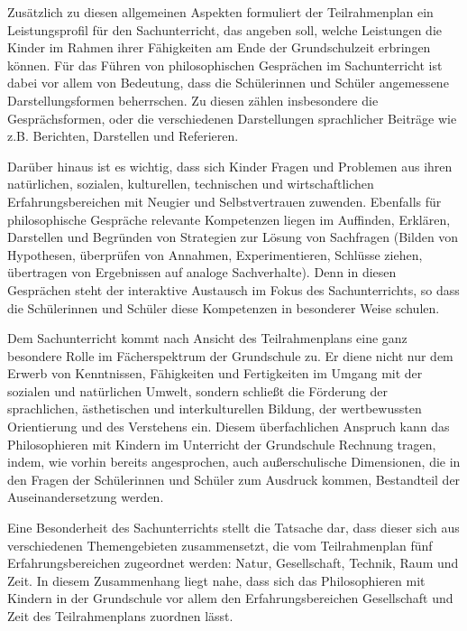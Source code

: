 Zusätzlich zu diesen allgemeinen Aspekten formuliert der Teilrahmenplan ein Leistungsprofil für den Sachunterricht, das angeben soll, welche Leistungen die Kinder im Rahmen ihrer Fähigkeiten am Ende der Grundschulzeit erbringen können. 
Für das Führen von philosophischen Gesprächen im Sachunterricht ist dabei vor allem von Bedeutung, dass die Schülerinnen und Schüler \glqq angemessene Darstellungsformen\grqq{} \cite[S.\,8]{MBFJ06} beherrschen.
Zu diesen zählen insbesondere die Gesprächsformen, oder die verschiedenen Darstellungen sprachlicher Beiträge wie z.B. Berichten, Darstellen und Referieren.

Darüber hinaus ist es wichtig, dass sich Kinder \glqq Fragen und Problemen aus ihren natürlichen, sozialen, kulturellen, technischen und wirtschaftlichen Erfahrungsbereichen mit Neugier und Selbstvertrauen\grqq{} \cite[S.\,8]{MBFJ06} zuwenden. 
Ebenfalls für philosophische Gespräche relevante Kompetenzen liegen im \glqq Auffinden, Erklären, Darstellen und Begründen von Strategien zur Lösung von Sachfragen (Bilden von Hypothesen, überprüfen von Annahmen, Experimentieren, Schlüsse ziehen, übertragen von Ergebnissen auf analoge Sachverhalte).\grqq{} \cite[S.\,8]{MBFJ06}
Denn in diesen Gesprächen steht der interaktive Austausch im Fokus des Sachunterrichts, so dass die Schülerinnen und Schüler diese Kompetenzen in besonderer Weise schulen.

Dem Sachunterricht kommt nach Ansicht des Teilrahmenplans eine ganz besondere Rolle im Fächerspektrum der Grundschule zu. 
Er diene \glqq nicht nur dem Erwerb von Kenntnissen, Fähigkeiten und Fertigkeiten im Umgang mit der sozialen und natürlichen Umwelt, sondern schließt die Förderung der sprachlichen, ästhetischen und interkulturellen Bildung, der wertbewussten Orientierung und des Verstehens ein.\grqq{} \cite[S.\,9]{MBFJ06} 
Diesem überfachlichen Anspruch kann das Philosophieren mit Kindern im Unterricht der Grundschule Rechnung tragen, indem, wie vorhin bereits angesprochen, auch außerschulische Dimensionen, die in den Fragen der Schülerinnen und Schüler zum Ausdruck kommen, Bestandteil der Auseinandersetzung werden.

Eine Besonderheit des Sachunterrichts stellt die Tatsache dar, dass dieser sich aus verschiedenen Themengebieten zusammensetzt, die vom Teilrahmenplan fünf Erfahrungsbereichen zugeordnet werden: Natur, Gesellschaft, Technik, Raum und Zeit. 
In diesem Zusammenhang liegt nahe, dass sich das Philosophieren mit Kindern in der Grundschule vor allem den Erfahrungsbereichen \glqq Gesellschaft\grqq{} und \glqq Zeit\grqq{} des Teilrahmenplans zuordnen lässt. 

